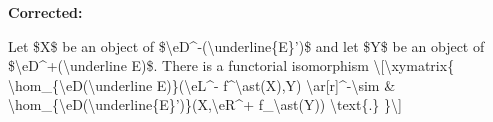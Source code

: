 \begin{description}
\par\noindent\textbf{Corrected:} {\footnotesize\ttfamily\raggedright Let \$X\$ be an object of \$\textbackslash{}\allowbreak{}eD\textasciicircum{}\allowbreak{}-\allowbreak{}(\allowbreak{}\textbackslash{}\allowbreak{}underline\{\allowbreak{}E\}\allowbreak{}')\allowbreak{}\$ and let \$Y\$ be an object of \$\textbackslash{}\allowbreak{}eD\textasciicircum{}\allowbreak{}+\allowbreak{}(\allowbreak{}\textbackslash{}\allowbreak{}underline E)\allowbreak{}\$. There is a functorial isomorphism \textbackslash{}\allowbreak{}[\allowbreak{}\textbackslash{}\allowbreak{}xymatrix\{\allowbreak{}   \textbackslash{}\allowbreak{}hom\_\allowbreak{}\{\allowbreak{}\textbackslash{}\allowbreak{}eD(\allowbreak{}\textbackslash{}\allowbreak{}underline E)\allowbreak{}\}\allowbreak{}(\allowbreak{}\textbackslash{}\allowbreak{}eL\textasciicircum{}\allowbreak{}-\allowbreak{} f\textasciicircum{}\allowbreak{}\textbackslash{}\allowbreak{}ast(\allowbreak{}X)\allowbreak{},\allowbreak{}Y)\allowbreak{} \textbackslash{}\allowbreak{}ar[\allowbreak{}r]\allowbreak{}\textasciicircum{}\allowbreak{}-\allowbreak{}\textbackslash{}\allowbreak{}sim     \& \textbackslash{}\allowbreak{}hom\_\allowbreak{}\{\allowbreak{}\textbackslash{}\allowbreak{}eD(\allowbreak{}\textbackslash{}\allowbreak{}underline\{\allowbreak{}E\}\allowbreak{}')\allowbreak{}\}\allowbreak{}(\allowbreak{}X,\allowbreak{}\textbackslash{}\allowbreak{}eR\textasciicircum{}\allowbreak{}+\allowbreak{} f\_\allowbreak{}\textbackslash{}\allowbreak{}ast(\allowbreak{}Y)\allowbreak{})\allowbreak{} \textbackslash{}\allowbreak{}text\{\allowbreak{}.\}\allowbreak{} \}\allowbreak{}\textbackslash{}\allowbreak{}]\allowbreak{}\par}
\smallskip
\end{description}
\endgroup
\fi
